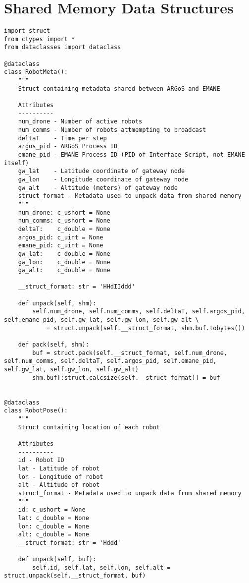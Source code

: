 \section{Shared Memory Data Structures}
\begin{verbatim}
import struct
from ctypes import *
from dataclasses import dataclass

@dataclass
class RobotMeta():
    """
    Struct containing metadata shared between ARGoS and EMANE

    Attributes
    ----------
    num_drone - Number of active robots
    num_comms - Number of robots attmempting to broadcast
    deltaT    - Time per step
    argos_pid - ARGoS Process ID
    emane_pid - EMANE Process ID (PID of Interface Script, not EMANE itself)
    gw_lat    - Latitude coordinate of gateway node
    gw_lon    - Longitude coordinate of gateway node
    gw_alt    - Altitude (meters) of gateway node
    struct_format - Metadata used to unpack data from shared memory
    """
    num_drone: c_ushort = None
    num_comms: c_ushort = None
    deltaT:    c_double = None
    argos_pid: c_uint = None
    emane_pid: c_uint = None
    gw_lat:    c_double = None
    gw_lon:    c_double = None
    gw_alt:    c_double = None

    __struct_format: str = 'HHdIIddd'

    def unpack(self, shm):
        self.num_drone, self.num_comms, self.deltaT, self.argos_pid, self.emane_pid, self.gw_lat, self.gw_lon, self.gw_alt \
            = struct.unpack(self.__struct_format, shm.buf.tobytes())

    def pack(self, shm):
        buf = struct.pack(self.__struct_format, self.num_drone, self.num_comms, self.deltaT, self.argos_pid, self.emane_pid, self.gw_lat, self.gw_lon, self.gw_alt)
        shm.buf[:struct.calcsize(self.__struct_format)] = buf


@dataclass
class RobotPose():
    """
    Struct containing location of each robot

    Attributes
    ----------
    id - Robot ID
    lat - Latitude of robot
    lon - Longitude of robot
    alt - Altitude of robot
    struct_format - Metadata used to unpack data from shared memory
    """
    id: c_ushort = None
    lat: c_double = None
    lon: c_double = None
    alt: c_double = None
    __struct_format: str = 'Hddd'

    def unpack(self, buf):
        self.id, self.lat, self.lon, self.alt = struct.unpack(self.__struct_format, buf)


\end{verbatim}
